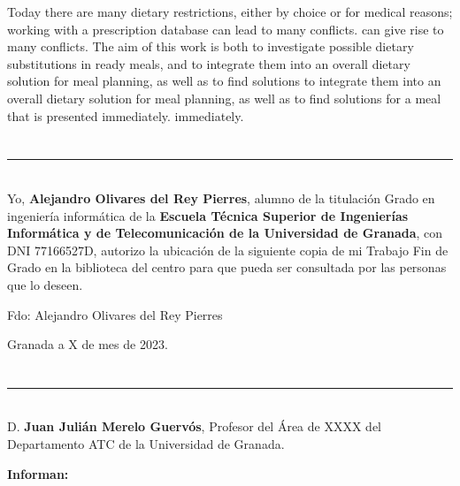 Today there are many dietary restrictions, either by choice or for medical reasons; working with a prescription database can lead to many conflicts.
can give rise to many conflicts. The aim of this work is both to investigate possible dietary substitutions in ready meals, and to integrate them into an overall dietary solution for meal planning, as well as to find solutions to
integrate them into an overall dietary solution for meal planning, as well as to find solutions for a meal that is presented immediately.
immediately.

\chapter*{}
\thispagestyle{empty}

\noindent\rule[-1ex]{\textwidth}{2pt}\\[4.5ex]

Yo, \textbf{Alejandro Olivares del Rey Pierres}, alumno de la titulación Grado en ingeniería informática de la \textbf{Escuela Técnica Superior
de Ingenierías Informática y de Telecomunicación de la Universidad de Granada}, con DNI 77166527D, autorizo la
ubicación de la siguiente copia de mi Trabajo Fin de Grado en la biblioteca del centro para que pueda ser
consultada por las personas que lo deseen.

\vspace{6cm}

\noindent Fdo: Alejandro Olivares del Rey Pierres

\vspace{2cm}

\begin{flushright}
Granada a X de mes de 2023.
\end{flushright}


\chapter*{}
\thispagestyle{empty}

\noindent\rule[-1ex]{\textwidth}{2pt}\\[4.5ex]

D. \textbf{Juan Julián Merelo Guervós}, Profesor del Área de XXXX del Departamento ATC de la Universidad de Granada.

\vspace{0.5cm}

\textbf{Informan:}

\vspace{0.5cm}

